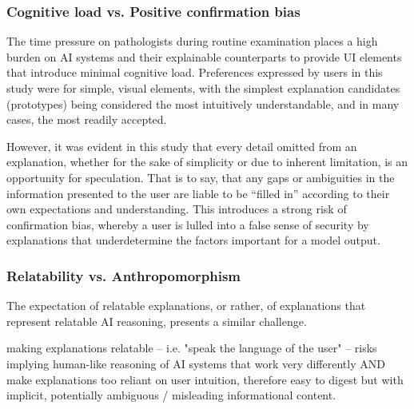 \subsubsection{Cognitive load vs. Positive confirmation bias}

The time pressure on pathologists during routine examination places a high burden on AI systems and their explainable counterparts to provide UI elements that introduce minimal cognitive load. Preferences expressed by users in this study were for simple, visual elements, with the simplest explanation candidates (prototypes) being considered the most intuitively understandable, and in many cases, the most readily accepted.

However, it was evident in this study that every detail omitted from an explanation, whether for the sake of simplicity or due to inherent limitation, is an opportunity for speculation. That is to say, that any gaps or ambiguities in the information presented to the user are liable to be ``filled in'' according to their own expectations and understanding. This introduces a strong risk of confirmation bias, whereby a user is lulled into a false sense of security by explanations that underdetermine the factors important for a model output. 


\subsubsection{Relatability vs. Anthropomorphism}

The expectation of relatable explanations, or rather, of explanations that represent relatable AI reasoning, presents a similar challenge. 

making explanations relatable -- i.e. "speak the language of the user" -- risks implying human-like reasoning of AI systems that work very differently AND make explanations too reliant on user intuition, therefore easy to digest but with implicit, potentially ambiguous / misleading informational content. 

